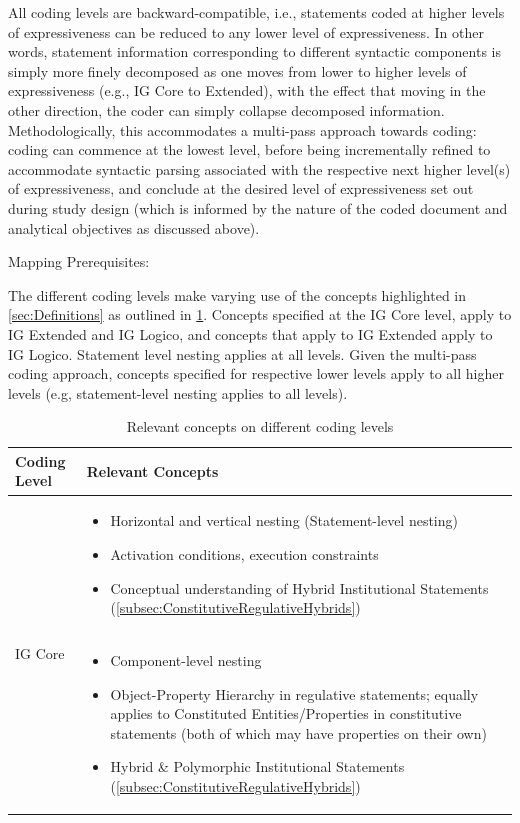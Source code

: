 All coding levels are backward-compatible, i.e., statements coded at higher levels of expressiveness can be reduced to any lower level of expressiveness. In other words, statement information corresponding to different syntactic components is simply more finely decomposed as one moves from lower to higher levels of expressiveness (e.g., IG Core to Extended), with the effect that moving in the other direction, the coder can simply collapse decomposed information. Methodologically, this accommodates a multi-pass approach towards coding: coding can commence at the lowest level, before being incrementally refined to accommodate syntactic parsing associated with the respective next higher level(s) of expressiveness, and conclude at the desired level of expressiveness set out during study design (which is informed by the nature of the coded document and analytical objectives as discussed above).

\begin{ptit}Mapping Prerequisites:\end{ptit}

The different coding levels make varying use of the concepts highlighted in \cref{sec:Definitions} as outlined in \cref{tab:ConceptsAndCodingLevels}. Concepts specified at the IG Core level, apply to IG Extended and IG Logico, and concepts that apply to IG Extended apply to IG Logico. Statement level nesting applies at all levels. Given the multi-pass coding approach, concepts specified for respective lower levels apply to all higher levels (e.g, statement-level nesting applies to all levels). 
 
\begin{table}[h!]
\centering
\begin{tabular}{p{3cm} p{12cm}}
\toprule
\textbf{Coding Level} & 
\textbf{Relevant Concepts} \\
\toprule
\multirow{6}{*}{IG Core} & \begin{itemize}
    \item Horizontal and vertical nesting (Statement-level nesting) 
    \item Activation conditions, execution constraints 
    \item Conceptual understanding of Hybrid Institutional Statements (\cref{subsec:ConstitutiveRegulativeHybrids})
\end{itemize} \\
\midrule
\multirow{10}{*}{IG Extended} & \begin{itemize}
    \item Component-level nesting 
    \item Object-Property Hierarchy in regulative statements; equally applies to Constituted Entities/Properties in constitutive statements (both of which may have properties on their own)
    \item Hybrid \& Polymorphic Institutional Statements (\cref{subsec:ConstitutiveRegulativeHybrids})
\end{itemize} \\
\toprule
\end{tabular}
\caption{Relevant concepts on different coding levels}
\label{tab:ConceptsAndCodingLevels}
\end{table}

